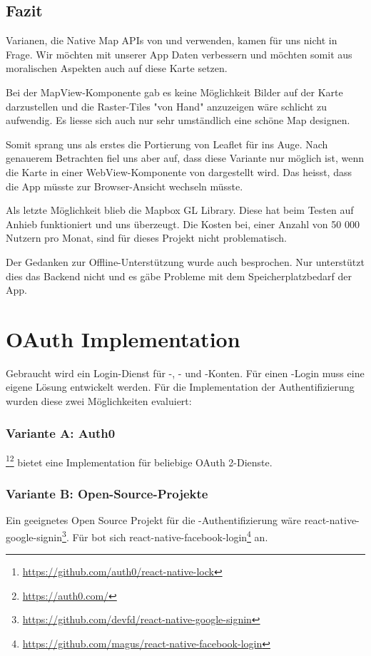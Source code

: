 \subsection{Fazit}
Varianen, die Native Map APIs von  und  verwenden, kamen für uns nicht in Frage.
Wir möchten mit unserer App  Daten verbessern und möchten somit aus moralischen Aspekten auch auf diese Karte setzen. 

Bei der  MapView-Komponente gab es keine Möglichkeit Bilder auf der Karte darzustellen und die Raster-Tiles "von Hand" anzuzeigen wäre schlicht zu aufwendig. 
Es liesse sich auch nur sehr umständlich eine schöne Map designen.

Somit sprang uns als erstes die Portierung von Leaflet für  ins Auge. 
Nach genauerem Betrachten fiel uns aber auf, dass diese Variante nur möglich ist, wenn die Karte in einer WebView-Komponente von  dargestellt wird. 
Das heisst, dass die App müsste zur Browser-Ansicht wechseln müsste.

Als letzte Möglichkeit blieb die Mapbox GL Library.
Diese hat beim Testen auf Anhieb funktioniert und uns überzeugt.
Die Kosten bei, einer Anzahl von 50 000 Nutzern pro Monat, sind für dieses Projekt nicht problematisch.\cite{mapbox-pricing}

Der Gedanken zur Offline-Unterstützung wurde auch besprochen.
Nur unterstützt dies das Backend nicht und es gäbe Probleme mit dem Speicherplatzbedarf der App. 


\section{OAuth Implementation}
\label{tb-evaluation-oauth}
Gebraucht wird ein Login-Dienst für -, - und -Konten. 
Für einen -Login muss eine eigene Lösung entwickelt werden. 
Für die Implementation der Authentifizierung wurden diese zwei Möglichkeiten evaluiert:


\subsubsection{Variante A: Auth0}
\footnote{\url{https://github.com/auth0/react-native-lock}}\footnote{\url{https://auth0.com/}} bietet eine Implementation für beliebige \gls{OAuth} 2-Dienste. 


\subsubsection{Variante B: Open-Source-Projekte}
Ein geeignetes Open Source Projekt für die -Authentifizierung wäre react-native-google-signin\footnote{\url{https://github.com/devfd/react-native-google-signin}}. 
Für  bot sich react-native-facebook-login\footnote{\url{https://github.com/magus/react-native-facebook-login}} an. 

